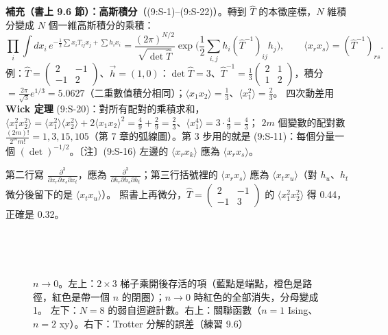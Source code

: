 \textbf{補充（書上 9.6 節）：高斯積分}（(9:S-1)--(9:S-22)）。轉到 $\hat T$ 的本徵座標，$N$ 維積分變成 $N$ 個一維高斯積分的乘積：
\[\prod_i\int dx_i\,e^{-\frac12\sum x_iT_{ij}x_j+\sum h_ix_i}=\frac{(2\pi)^{N/2}}{\sqrt{\det\hat T}}\exp\Big(\frac12\sum_{i,j}h_i(\hat T^{-1})_{ij}h_j\Big),\qquad\langle x_rx_s\rangle=(\hat T^{-1})_{rs}.\tag{9:S-11, 9:S-18}\]
例：$\hat T=\begin{pmatrix}2&-1\\-1&2\end{pmatrix}$、$\vec h=(1,0)$：$\det\hat T=3$、$\hat T^{-1}=\frac13\begin{pmatrix}2&1\\1&2\end{pmatrix}$，積分 $=\frac{2\pi}{\sqrt3}e^{1/3}=5.0627$（二重數值積分相同）；$\langle x_1x_2\rangle=\frac13$、$\langle x_1^2\rangle=\frac23$。
四次動差用 \textbf{Wick 定理} (9:S-20)：對所有配對的乘積求和，$\langle x_1^2x_2^2\rangle=\langle x_1^2\rangle\langle x_2^2\rangle+2\langle x_1x_2\rangle^2=\frac49+\frac29=\frac23$、$\langle x_1^4\rangle=3\cdot\frac49=\frac43$；
$2m$ 個變數的配對數 $\frac{(2m)!}{2^mm!}=1,3,15,105$（第 7 章的弧線圖）。第 3 步用的就是 (9:S-11)：每個分量一個 $(\det)^{-1/2}$。〔注〕(9:S-16) 左邊的 $\langle x_rx_k\rangle$ 應為 $\langle x_rx_s\rangle$。
\begin{errbox}[p.~230，(9:S-19)]
第二行寫 $\frac{\partial^3}{\partial x_r\partial x_s\partial x_t}$，應為 $\frac{\partial^3}{\partial h_r\partial h_s\partial h_t}$；第三行括號裡的 $\langle x_rx_s\rangle$ 應為 $\langle x_tx_u\rangle$（對 $h_u$、$h_t$ 微分後留下的是 $\langle x_tx_u\rangle$）。
照書上再微分，$\hat T=\begin{pmatrix}2&-1\\-1&3\end{pmatrix}$ 的 $\langle x_1^2x_2^2\rangle$ 得 0.44，正確是 0.32。
\end{errbox}

\begin{figure}[htbp]
\centering
\begin{minipage}[c]{0.5\linewidth}\centering\NineFigLadder\\[6pt]\footnotesize\setlength{\tabcolsep}{2.5pt}\NineTabWeak\end{minipage}\hfill
\begin{minipage}[c]{0.48\linewidth}\centering\footnotesize\setlength{\tabcolsep}{2.5pt}\NineTabLadder\\[8pt]\setlength{\tabcolsep}{3pt}\NineTabTrotter\end{minipage}
\caption{$n\to0$。左上：$2\times3$ 梯子乘開後存活的項（藍點是端點，橙色是路徑，紅色是帶一個 $n$ 的閉圈）；$n\to0$ 時紅色的全部消失，分母變成 1。
左下：$N=8$ 的弱自迴避計數。右上：關聯函數（$n=1$ Ising、$n=2$ xy）。右下：Trotter 分解的誤差（練習 9.6）}\label{nine-fig-n0}
\end{figure}

